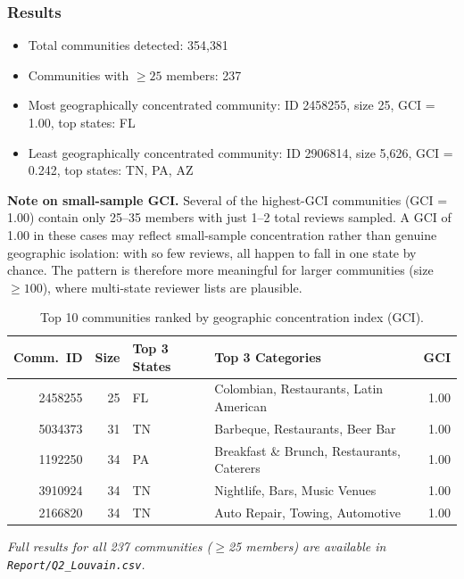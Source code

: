\documentclass[11pt,a4paper]{article}
\begin{document}
\subsubsection*{Results}

\begin{itemize}
  \item Total communities detected: 354{,}381
  \item Communities with $\geq 25$ members: 237
  \item Most geographically concentrated community:
        ID 2458255, size 25,
        GCI = 1.00, top states: FL
  \item Least geographically concentrated community:
        ID 2906814, size 5{,}626,
        GCI = 0.242, top states: TN, PA, AZ
\end{itemize}

\textbf{Note on small-sample GCI.}
Several of the highest-GCI communities (GCI = 1.00) contain only 25--35 members
with just 1--2 total reviews sampled.
A GCI of 1.00 in these cases may reflect small-sample concentration rather than
genuine geographic isolation: with so few reviews, all happen to fall in one state
by chance.
The pattern is therefore more meaningful for larger communities (size $\geq 100$),
where multi-state reviewer lists are plausible.

\begin{table}[H]
\centering\small
\caption{Top 10 communities ranked by geographic concentration index (GCI).}
\begin{tabularx}{\textwidth}{rrXXr}
\toprule
\textbf{Comm.\ ID} & \textbf{Size} & \textbf{Top 3 States} & \textbf{Top 3 Categories} & \textbf{GCI}\\
\midrule
2458255  & 25   & FL         & Colombian, Restaurants, Latin American        & 1.00\\
5034373  & 31   & TN         & Barbeque, Restaurants, Beer Bar               & 1.00\\
1192250  & 34   & PA         & Breakfast \& Brunch, Restaurants, Caterers    & 1.00\\
3910924  & 34   & TN         & Nightlife, Bars, Music Venues                 & 1.00\\
2166820  & 34   & TN         & Auto Repair, Towing, Automotive               & 1.00\\
\bottomrule
\end{tabularx}
\end{table}

\textit{Full results for all 237 communities ($\geq$25 members) are available in \texttt{Report/Q2\_Louvain.csv}.}
\end{document}
